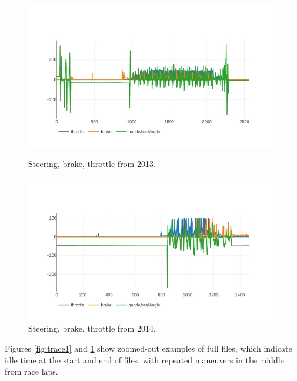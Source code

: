 \documentclass{article}
\begin{document}
\begin{figure}[h!]
  \centering
  \begin{minipage}[b]{0.49\textwidth}
    \includegraphics[width=\textwidth]{20130810_01_01_01_grandsport-0-None-100-313a19e.jpeg}
    \caption{Steering, brake, throttle from 2013.}
    \label{fig:trace1}
  \end{minipage}
  \hfill
  \begin{minipage}[b]{0.49\textwidth}
    \includegraphics[width=\textwidth]{20140221_03_02_03_250lm-0-None-100-313a19e.jpeg}
    \caption{Steering, brake, throttle from 2014.}
    \label{fig:trace2}
  \end{minipage}
\end{figure}

Figures \ref{fig:trace1} and \ref{fig:trace2} show zoomed-out examples of full files, which indicate idle time at the start and end of files, with repeated maneuvers in the middle from race laps.
\end{document}

